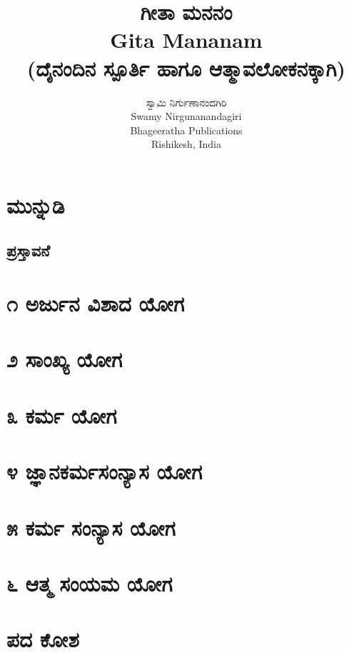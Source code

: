 \documentclass[12pt,twoside,openright,a5paper]{book}
\title{\Huge \kanfont \textbf{ಗೀತಾ ಮನನಂ}\\
{\normalsize Gita Mananam\\}
{\small(ದೈನಂದಿನ ಸ್ಪೂರ್ತಿ ಹಾಗೂ ಆತ್ಮಾವಲೋಕನಕ್ಕಾಗಿ)}}
\author{\large \kanfont ಸ್ವಾಮಿ ನಿರ್ಗುಣಾನಂದಗಿರಿ\\
{\normalsize Swamy Nirgunanandagiri}\\
\vspace{15mm}
{\normalsize Bhageeratha Publications}\\
{Rishikesh, India}
}
\date{} %
\begin{document}




\thispagestyle{empty}
\frontmatter

\doublespacing
\tableofcontents
\singlespacing

\thispagestyle{empty}
\thispagestyle{empty}
\pagestyle{fancy}


\chapter{\kanfont ಮುನ್ನುಡಿ}

\begin{onehalfspace}
\chapter{\kanfont ಪ್ರಸ್ತಾವನೆ}

\end{onehalfspace}
\mainmatter
%
\chapter{\kanfont ೧ ಅರ್ಜುನ ವಿಶಾದ ಯೋಗ}
%
\makeatletter\@openrightfalse

\chapter{\kanfont ೨ ಸಾಂಖ್ಯ ಯೋಗ}

\chapter{\kanfont ೩ ಕರ್ಮ ಯೋಗ}

\chapter{\kanfont ೪ ಜ್ಞಾನಕರ್ಮಸಂನ್ಯಾಸ ಯೋಗ}

\chapter{\kanfont ೫ ಕರ್ಮ ಸಂನ್ಯಾಸ ಯೋಗ}

\chapter{\kanfont ೬ ಆತ್ಮ ಸಂಯಮ ಯೋಗ}

\chapter{\kanfont ಪದ ಕೋಶ}

\printindex

\end{document}
